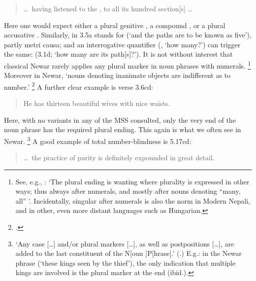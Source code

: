 \begin{quote}

\dots\ having listened to the , 
to all its hundred section[s]  \dots
\end{quote}

\noindent
Here one would expect either a plural genitive ,
a compound , or a plural accusative .
Similarly,  in 3.5a stands for
 (`and the paths are to be known as five'), 
partly metri causa; and an interrogative quantifier (, `how many?') can
trigger the same:  (3.1d; `how many are its path[s]?').
It is not without interest that classical Newar rarely applies
any plural marker in noun phrases with numerals.\label{singularwithnumerals}%
	\footnote{See, e.g., :
			`The plural ending is wanting where plurality is expressed 
			in other ways; thus always after numerals, and
			mostly after nouns denoting ``many, all'' '.
			 Incidentally, singular after numerals is also the norm in Modern Nepali,
									 and in other, even more distant languages
									 such as Hungarian.} 
Moreover in Newar, `nouns denoting inanimate objects 
are indifferent as to number.'%
	\footnote{.}
A further clear example is verse 3.6cd:

\begin{quote}

       He has thirteen beautiful wives with nice waists.
\end{quote}

\noindent
Here, with no variants in any of the MSS consulted, only the very end 
of the noun phrase  has the required 
plural ending. This again is what we often see in Newar.%
		\footnote{`Any case [\dots] and/or plural markers [\dots], as well as 
		postpositions [\dots], are added to the last constituent of the 
		N[oun ]P[hrase].' (.)
		E.g.: in the Newar phrase 
		(`these kings seen by the thief'), the only indication that
		multiple kings are involved is the plural marker 
		at the end (ibid.).}
A good example of total number-blindness is 5.17cd: 

\begin{quote}

\dots\ the practice of purity is definitely expounded in great detail.
\end{quote}

